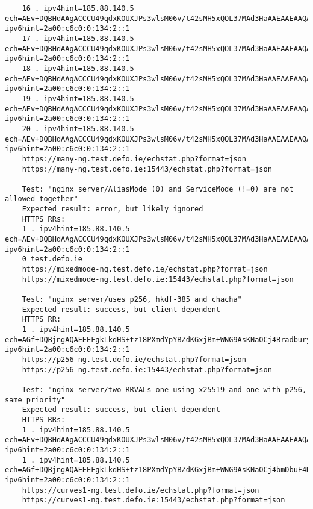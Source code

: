 \begin{verbatim}
    16 . ipv4hint=185.88.140.5 ech=AEv+DQBHdAAgACCCU49qdxKOUXJPs3wlsM06v/t42sMH5xQOL37MAd3HaAAEAAEAAQAYb3RoZXJwdWJsaWMudGVzdC5kZWZvLmllAAA= ipv6hint=2a00:c6c0:0:134:2::1
    17 . ipv4hint=185.88.140.5 ech=AEv+DQBHdAAgACCCU49qdxKOUXJPs3wlsM06v/t42sMH5xQOL37MAd3HaAAEAAEAAQAYb3RoZXJwdWJsaWMudGVzdC5kZWZvLmllAAA= ipv6hint=2a00:c6c0:0:134:2::1
    18 . ipv4hint=185.88.140.5 ech=AEv+DQBHdAAgACCCU49qdxKOUXJPs3wlsM06v/t42sMH5xQOL37MAd3HaAAEAAEAAQAYb3RoZXJwdWJsaWMudGVzdC5kZWZvLmllAAA= ipv6hint=2a00:c6c0:0:134:2::1
    19 . ipv4hint=185.88.140.5 ech=AEv+DQBHdAAgACCCU49qdxKOUXJPs3wlsM06v/t42sMH5xQOL37MAd3HaAAEAAEAAQAYb3RoZXJwdWJsaWMudGVzdC5kZWZvLmllAAA= ipv6hint=2a00:c6c0:0:134:2::1
    20 . ipv4hint=185.88.140.5 ech=AEv+DQBHdAAgACCCU49qdxKOUXJPs3wlsM06v/t42sMH5xQOL37MAd3HaAAEAAEAAQAYb3RoZXJwdWJsaWMudGVzdC5kZWZvLmllAAA= ipv6hint=2a00:c6c0:0:134:2::1
    https://many-ng.test.defo.ie/echstat.php?format=json
    https://many-ng.test.defo.ie:15443/echstat.php?format=json

    Test: "nginx server/AliasMode (0) and ServiceMode (!=0) are not allowed together"
    Expected result: error, but likely ignored
    HTTPS RRs:
    1 . ipv4hint=185.88.140.5 ech=AEv+DQBHdAAgACCCU49qdxKOUXJPs3wlsM06v/t42sMH5xQOL37MAd3HaAAEAAEAAQAYb3RoZXJwdWJsaWMudGVzdC5kZWZvLmllAAA= ipv6hint=2a00:c6c0:0:134:2::1
    0 test.defo.ie
    https://mixedmode-ng.test.defo.ie/echstat.php?format=json
    https://mixedmode-ng.test.defo.ie:15443/echstat.php?format=json

    Test: "nginx server/uses p256, hkdf-385 and chacha"
    Expected result: success, but client-dependent
    HTTPS RR:
    1 . ipv4hint=185.88.140.5 ech=AGf+DQBjngAQAEEEFgkLkdHS+tz18PXmdYpYBZdKGxjBm+WNG9AsKNaOCj4Bradbury4KyvHEZGj6+Wls1VBe1OXierpjGiYOEriOWnAAEAAIAAwATcHVibGljLnRlc3QuZGVmby5pZQAA ipv6hint=2a00:c6c0:0:134:2::1
    https://p256-ng.test.defo.ie/echstat.php?format=json
    https://p256-ng.test.defo.ie:15443/echstat.php?format=json

    Test: "nginx server/two RRVALs one using x25519 and one with p256, same priority"
    Expected result: success, but client-dependent
    HTTPS RRs:
    1 . ipv4hint=185.88.140.5 ech=AEv+DQBHdAAgACCCU49qdxKOUXJPs3wlsM06v/t42sMH5xQOL37MAd3HaAAEAAEAAQAYb3RoZXJwdWJsaWMudGVzdC5kZWZvLmllAAA= ipv6hint=2a00:c6c0:0:134:2::1
    1 . ipv4hint=185.88.140.5 ech=AGf+DQBjngAQAEEEFgkLkdHS+tz18PXmdYpYBZdKGxjBm+WNG9AsKNaOCj4bmDbuF4KyvHEZGj6+Wls1VBe1OXierpjGiYOEriOWnAAEAAIAAwATcHVibGljLnRlc3QuZGVmby5pZQAA ipv6hint=2a00:c6c0:0:134:2::1
    https://curves1-ng.test.defo.ie/echstat.php?format=json
    https://curves1-ng.test.defo.ie:15443/echstat.php?format=json


\end{verbatim}
